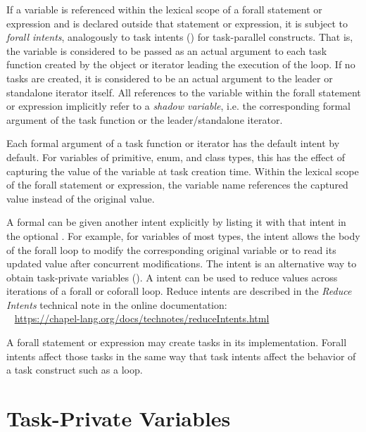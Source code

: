 If a variable is referenced within the lexical scope of a
forall statement or expression and is declared outside
that statement or expression, it is subject to \emph{forall intents},
analogously to task intents ()
for task-parallel constructs. That is, the variable is considered
to be passed as an actual argument to
each task function created by the object or iterator leading
the execution of the loop. If no tasks are created,
it is considered to be an actual argument to the leader or standalone
iterator itself. All references to the variable
within the forall statement or expression implicitly refer
to a \emph{shadow variable}, i.e.
the corresponding formal argument of the task function
or the leader/standalone iterator.

Each formal argument of a task function or iterator has the default
intent by default.  For variables of primitive, enum, and class
types, this has the effect of capturing the value of the
variable at task creation time.  Within the lexical scope of the
forall statement or expression, the variable name references the
captured value instead of the original value.

A formal can be given another intent explicitly by listing it
with that intent in the optional .
For example, for variables of most types, the  intent allows
the body of the forall loop to modify the corresponding original
variable or to read its updated value after concurrent modifications.
The  intent is an alternative way to obtain task-private
variables ().
A  intent can be used to reduce values across iterations
of a forall or coforall loop.
Reduce intents are described in the \emph{Reduce Intents} technical note
in the online documentation:
\\ %
\mbox{$$ $$ $$} %
\url{https://chapel-lang.org/docs/technotes/reduceIntents.html}

\begin{rationale}
A forall statement or expression may create tasks in its implementation.
Forall intents affect those tasks in the same way that task intents
affect the behavior of a task construct such as a  loop.
\end{rationale}


\section{Task-Private Variables}
\label{Task_Private_Variables}

